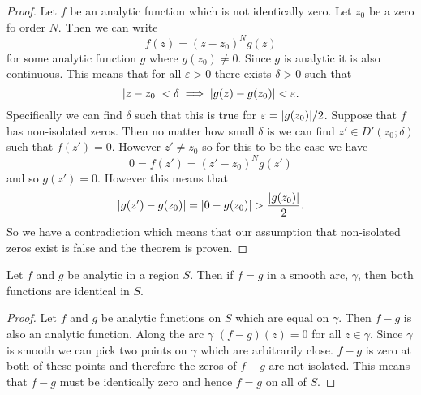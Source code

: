 \documentclass{article}
\newcommand{\discPunctured}[2]{D'\left({#1}; {#2}\right)}
\begin{document}
    \begin{proof}
        Let \(f\) be an analytic function which is not identically zero.
        Let \(z_0\) be a zero fo order \(N\).
        Then we can write
        \[f(z) = (z - z_0)^Ng(z)\]
        for some analytic function \(g\) where \(g(z_0)\ne 0\).
        Since \(g\) is analytic it is also continuous.
        This means that for all \(\varepsilon > 0\) there exists \(\delta>0\) such that
        \[\abs{z - z_0}<\delta \implies \abs{g(z) - g(z_0)} < \varepsilon.\]
        Specifically we can find \(\delta\) such that this is true for \(\varepsilon = \abs{g(z_0)}/2\).
        Suppose that \(f\) has non-isolated zeros.
        Then no matter how small \(\delta\) is we can find \(z'\in\discPunctured{z_0}{\delta}\) such that \(f(z') = 0\).
        However \(z' \ne z_0\) so for this to be the case we have
        \[0 = f(z') = (z' - z_0)^Ng(z')\]
        and so \(g(z') = 0\).
        However this means that
        \[\abs{g(z') - g(z_0)} = \abs{0 - g(z_0)} > \frac{\abs{g(z_0)}}{2}.\]
        So we have a contradiction which means that our assumption that non-isolated zeros exist is false and the theorem is proven.
    \end{proof}

    \begin{corollary}{}{}
        Let \(f\) and \(g\) be analytic in a region \(S\).
        Then if \(f = g\) in a smooth arc, \(\gamma\), then both functions are identical in \(S\).
    \end{corollary}
    \begin{proof}
        Let \(f\) and \(g\) be analytic functions on \(S\) which are equal on \(\gamma\).
        Then \(f - g\) is also an analytic function.
        Along the arc \(\gamma\) \((f - g)(z) = 0\) for all \(z\in\gamma\).
        Since \(\gamma\) is smooth we can pick two points on \(\gamma\) which are arbitrarily close.
        \(f - g\) is zero at both of these points and therefore the zeros of \(f - g\) are not isolated.
        This means that \(f - g\) must be identically zero and hence \(f = g\) on all of \(S\).
    \end{proof}
\end{document}
